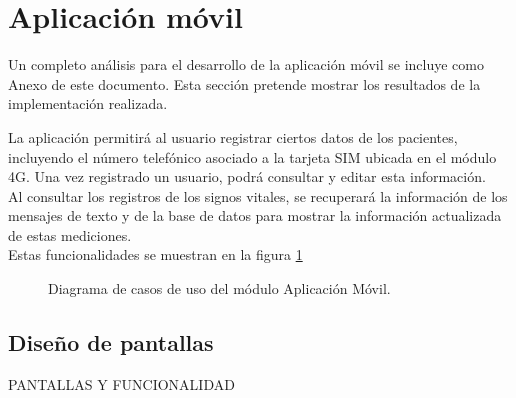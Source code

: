 \section{Aplicación móvil}

Un completo análisis para el desarrollo de la aplicación móvil se incluye como Anexo de este documento. Esta sección pretende mostrar los resultados de la implementación realizada.

La aplicación permitirá al usuario registrar ciertos datos de los pacientes, incluyendo el número telefónico asociado a la tarjeta SIM ubicada en el módulo 4G. Una vez registrado un usuario, podrá consultar y editar esta información. \\

Al consultar los registros de los signos vitales, se recuperará la información de los mensajes de texto y de la base de datos para mostrar la información actualizada de estas mediciones. \\

Estas funcionalidades se muestran en la figura \ref{fig:casosUso:AplicacionResumen}

\begin{figure}[htpb!]
	\begin{center}
		\caption{Diagrama de casos de uso del módulo Aplicación Móvil. \label{fig:casosUso:AplicacionResumen}}
	\end{center}
\end{figure}

\subsection{Diseño de pantallas}


PANTALLAS Y FUNCIONALIDAD